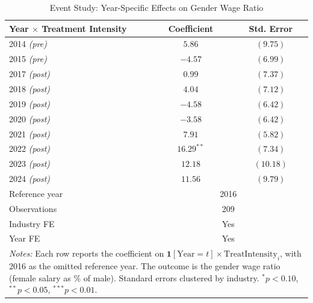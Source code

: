 \begin{table}[t]
\centering
\caption{Event Study: Year-Specific Effects on Gender Wage Ratio}
\label{tab:eventstudy}
\begin{tabular}{lcc}
\hline\hline
Year $\times$ Treatment Intensity & Coefficient & Std. Error \\
\hline
2014 \textit{(pre)} & $5.86$ & $(9.75)$ \\
2015 \textit{(pre)} & $-4.57$ & $(6.99)$ \\
2017 \textit{(post)} & $0.99$ & $(7.37)$ \\
2018 \textit{(post)} & $4.04$ & $(7.12)$ \\
2019 \textit{(post)} & $-4.58$ & $(6.42)$ \\
2020 \textit{(post)} & $-3.58$ & $(6.42)$ \\
2021 \textit{(post)} & $7.91$ & $(5.82)$ \\
2022 \textit{(post)} & $16.29^{**}$ & $(7.34)$ \\
2023 \textit{(post)} & $12.18$ & $(10.18)$ \\
2024 \textit{(post)} & $11.56$ & $(9.79)$ \\
\hline
Reference year & \multicolumn{2}{c}{2016} \\
Observations & \multicolumn{2}{c}{209} \\
Industry FE & \multicolumn{2}{c}{Yes} \\
Year FE & \multicolumn{2}{c}{Yes} \\
\hline\hline
\multicolumn{3}{p{0.85\textwidth}}{\footnotesize \textit{Notes:} Each row reports the coefficient on $\mathbf{1}[\text{Year}=t] \times \text{TreatIntensity}_{i}$, with 2016 as the omitted reference year. The outcome is the gender wage ratio (female salary as \% of male). Standard errors clustered by industry. $^{*}p<0.10$, $^{**}p<0.05$, $^{***}p<0.01$.} \\
\end{tabular}
\end{table}
